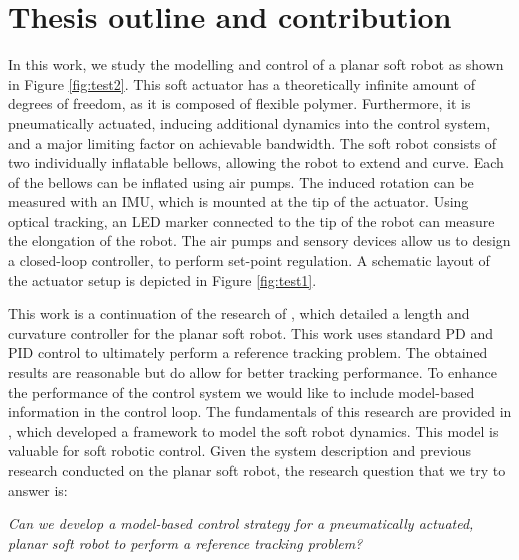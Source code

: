\section*{Thesis outline and contribution}

In this work, we study the modelling and control of a planar soft robot as shown in Figure \ref{fig:test2}. This soft actuator has a theoretically infinite amount of degrees of freedom, as it is composed of flexible polymer. Furthermore, it is pneumatically actuated, inducing additional dynamics into the control system, and a major limiting factor on achievable bandwidth. The soft robot consists of two individually inflatable bellows, allowing the robot to extend and curve. Each of the bellows can be inflated using air pumps. The induced rotation can be measured with an IMU, which is mounted at the tip of the actuator. Using optical tracking, an LED marker connected to the tip of the robot can measure the elongation of the robot. The air pumps and sensory devices allow us to design a closed-loop controller, to perform set-point regulation. A schematic layout of the actuator setup is depicted in Figure \ref{fig:test1}.

This work is a continuation of the research of \cite{berkers}, which detailed a length and curvature controller for the planar soft robot. This work uses standard PD and PID control to ultimately perform a reference tracking problem. The obtained results are reasonable but do allow for better tracking performance. To enhance the performance of the control system we would like to include model-based information in the control loop. The fundamentals of this research are provided in \cite{Caasenbrood2020}, which developed a framework to model the soft robot dynamics. This model is valuable for soft robotic control. Given the system description and previous research conducted on the planar soft robot, the research question that we try to answer is:

\textit{Can we develop a model-based control strategy for a pneumatically actuated, planar soft robot to perform a reference tracking problem?}





